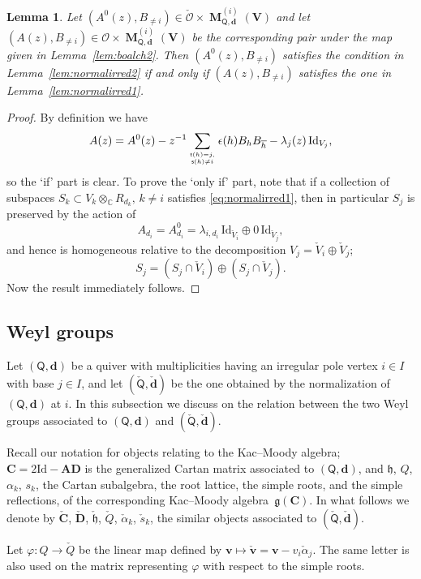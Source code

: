 \documentclass[pdftex]{sigma}
\numberwithin{equation}{section}
\newtheorem{Lemma}[Theorem]{Lemma}
\theoremstyle{definition}
\newcommand{\C}{\mathbb{C}} %
\newcommand{\g}{\mathfrak{g}} %
\newcommand{\h}{\mathfrak{h}} %
\newcommand{\unit}{\mathrm{Id}}
\newcommand{\bM}{\operatorname{\mathbf{M}}}
\newcommand{\bA}{\mathbf{A}} %
\newcommand{\bD}{\mathbf{D}} %
\newcommand{\bC}{\mathbf{C}} %
\newcommand{\bV}{\mathbf{V}}
\newcommand{\bv}{\mathbf{v}}
\newcommand{\ov}{\overline}
\newcommand{\ved}{\mathbf{d}}
\newcommand{\bO}{\mathcal{O}}
\newcommand{\sumfrac}[2]{\genfrac{}{}{0pt}{2}{#1}{#2}}
\newcommand{\vin}{\mathsf{t}} %
\newcommand{\vout}{\mathsf{s}} %
\newcommand{\QQ}{\mathsf{Q}} %
\begin{document}
\begin{Lemma}\label{lem:normalirred3}
Let $(A^0(z),B_{\neq i}) \in \check{\bO} \times \bM^{(i)}_{\QQ,\ved}(\bV)$
and let $(A(z),B_{\neq i}) \in \bO \times \bM^{(i)}_{\QQ,\ved}(\bV)$ be
the corresponding pair under the map given in Lemma~{\rm \ref{lem:boalch2}}.
Then $(A^0(z),B_{\neq i})$ satisfies the condition in Lemma~{\rm \ref{lem:normalirred2}}
if and only if $(A(z),B_{\neq i})$ satisfies the one in Lemma~{\rm \ref{lem:normalirred1}}.
\end{Lemma}

\begin{proof}
By def\/inition we have
\[
A(z)=A^0(z)
-z^{-1}\sum_{\sumfrac{\vin(h)=j,}{\vout(h)\neq i}}
\epsilon(h) B_h B_{\ov{h}}
-\lambda_j(z)\,\unit_{V_j},
\]
so the `if' part is clear.
To prove the `only if' part, note that if a collection of subspaces
$S_k \subset V_k \otimes_\C R_{d_k},\, k \neq i$
satisf\/ies \eqref{eq:normalirred1}, then in particular $S_j$
is preserved by the action of
\[
A_{d_i} = A^0_{d_i} = \lambda_{i,d_i}\,\unit_{\check{V}_i}
\oplus 0\, \unit_{\check{V}_j},
\]
and hence is homogeneous relative to the decomposition
$V_j = \check{V}_i \oplus \check{V}_j$;
\[
S_j=(S_j \cap \check{V}_i) \oplus (S_j \cap \check{V}_j).
\]
Now the result immediately follows.
\end{proof}

\subsection{Weyl groups}\label{subsec:weyl}

Let $(\QQ,\ved)$ be a quiver with multiplicities having
an irregular pole vertex $i \in I$ with base $j \in I$,
and let $(\check{\QQ},\check{\ved})$ be the one
obtained by the normalization of $(\QQ,\ved)$ at $i$.
In this subsection we discuss on the relation between the two Weyl groups
associated to $(\QQ,\ved)$ and $(\check{\QQ},\check{\ved})$.

Recall our notation for objects relating to the Kac--Moody algebra;
$\bC = 2 \unit - \bA \bD$ is the generalized Cartan matrix associated to
$(\QQ,\ved)$,
and $\h$, $Q$, $\alpha_k$, $s_k$, the Cartan subalgebra, the root lattice,
the simple roots, and the simple ref\/lections,
of the corresponding Kac--Moody algebra~$\g(\bC)$.
In what follows we denote by
$\check{\bC}$, $\check{\bD}$, $\check{\h}$, $\check{Q}$, $\check{\alpha}_k$,
$\check{s}_k$, the similar objects associated to $(\check{\QQ},\check{\ved})$.

Let $\varphi \colon Q \to \check{Q}$ be the linear map
def\/ined by $\bv \mapsto \check{\bv}=\bv-v_i \check{\alpha}_j$.
The same letter is also used
on the matrix representing $\varphi$ with respect to the simple roots.
\end{document}
